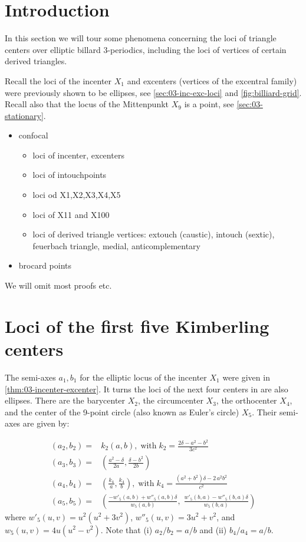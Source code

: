 \section{Introduction}

In this section we will tour some phenomena concerning the loci of triangle centers over elliptic billard 3-periodics, including the loci of vertices of certain derived triangles.

Recall the loci of the incenter $X_1$ and excenters (vertices of the excentral family) were previously shown to be ellipses, see \cref{sec:03-inc-exc-loci} and \cref{fig:billiard-grid}. Recall also that the locus of the Mittenpunkt $X_9$ is a point, see \cref{sec:03-stationary}.

\begin{itemize}
\item confocal
    \begin{itemize}
        \item loci of incenter, excenters
        \item loci of intouchpoints
        \item loci od X1,X2,X3,X4,X5
        \item loci of X11 and X100
        \item loci of derived triangle vertices: extouch (caustic), intouch (sextic), feuerbach triangle, medial, anticomplementary 
    \end{itemize}
    \item brocard points
\end{itemize}

We will omit most proofs etc.

\section{Loci of the first five Kimberling centers}

The semi-axes $a_1,b_1$ for the elliptic locus of the incenter $X_1$ were given in \cref{thm:03-incenter-excenter}. It turns the loci of the next four centers in \cite{etc} are also ellipses. There are the barycenter $X_2$, the circumcenter $X_3$, the orthocenter $X_4$, and the center of the 9-point circle (also known as Euler's circle) $X_5$. Their semi-axes are given by:

\begin{align*}
    \left(a_2,b_2\right)=&k_2\left(a,b\right),\;\text{with}\; k_2=\frac{2\delta -a^{2}-b^{2}}{3c^2}\\
     \left(a_3,b_3\right)=&\left(\frac{a^{2}-\delta}{2a},\frac{\delta-b^{2}}{2b}\right)\\
 \left(a_4,b_4\right)=&\left(\frac{k_4}a,\frac{k_4}b\right),\;\text{with}\;k_4=\frac{  (a^{2}+b^{2})\delta-2\,a^{2}b^{2} }{c^2}\\
   \left(a_5,b_5\right)=&\left(\frac{- w'_5(a,b)+ w''_5(a,b) \delta}{ w_5(a,b)},\;\frac{ w'_5(b,a)-{w''_5(b,a) \delta}}{w_5(b,a)}\right)
\end{align*}
where $w'_5(u,v)=u^2(u^2+3v^2)$, $w''_5(u,v)=3u^2+ v^2$, and $w_5(u,v)=4u(u^2-v^2)$. Note that (i) $a_2/b_2=a/b$ and (ii) $b_4/a_4=a/b$.

